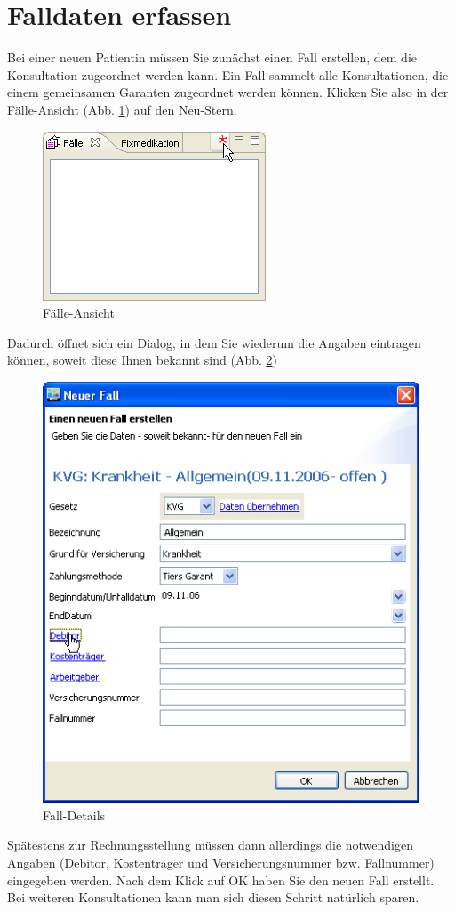 \section{Falldaten erfassen}
Bei einer neuen Patientin müssen Sie zunächst einen \glqq Fall\grqq{} erstellen, dem
die Konsultation zugeordnet werden kann. Ein Fall sammelt alle Konsultationen, die einem gemeinsamen Garanten
zugeordnet werden können. Klicken Sie also in der \glqq Fälle\grqq{}-Ansicht
(Abb. \ref{fig:faelle1}) auf den \glqq Neu\grqq{}-Stern.
\begin{figure}[ht]
	\includegraphics{images/einf3}
	\caption{Fälle-Ansicht}
	\label{fig:faelle1}
\end{figure}
Dadurch öffnet sich ein Dialog, in dem Sie wiederum die Angaben eintragen
können, soweit diese Ihnen bekannt sind (Abb. \ref{fig:falldetail})
\begin{figure}[ht]
	\includegraphics{images/einf4}
	\caption{Fall-Details}
	\label{fig:falldetail}
\end{figure}
Spätestens zur Rechnungsstellung müssen dann allerdings die notwendigen Angaben (Debitor, Kostenträger und Versicherungsnummer bzw. Fallnummer)
eingegeben werden.
Nach dem Klick auf OK haben Sie den neuen Fall erstellt. Bei weiteren
Konsultationen kann man sich diesen Schritt natürlich sparen.


